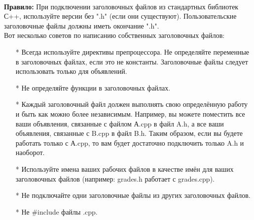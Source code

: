 \documentclass[a4paper,16pt]{report} %
\begin{document}
\\
\textbf{Правило:} При подключении заголовочных файлов из стандартных библиотек С++, используйте версии без ".h" (если они существуют). Пользовательские заголовочные файлы должны иметь окончание ".h".
\\
Вот несколько советов по написанию собственных заголовочных файлов:
\begin{itemize}
\item[*]Всегда используйте директивы препроцессора.
Не определяйте переменные в заголовочных файлах, если это не константы. Заголовочные файлы следует использовать только для объявлений.
\item[*]Не определяйте функции в заголовочных файлах.
\item[*]Каждый заголовочный файл должен выполнять свою определённую работу и быть как можно более независимым. Например, вы можете поместить все ваши объявления, связанные с файлом А.cpp в файл A.h, а все ваши объявления, связанные с B.cpp в файл B.h. Таким образом, если вы будете работать только с А.cpp, то вам будет достаточно подключить только A.h и наоборот.
\item[*]Используйте имена ваших рабочих файлов в качестве имён для ваших заголовочных файлов (например: grades.h работает с grades.cpp).
\item[*]Не подключайте одни заголовочные файлы из других заголовочных файлов.
\item[*]Не \#include  файлы .cpp.
\end{itemize}
\end{document}

